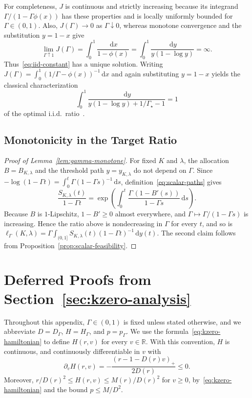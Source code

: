 \documentclass[11pt]{article}
\theoremstyle{definition}
\theoremstyle{remark}
\newcommand{\R}{\mathbb R}
\newcommand{\dd}{\,\mathrm d}
\newcommand{\pos}[1]{\left(#1\right)_+}
\begin{document}
For completeness, $J$ is continuous and strictly increasing because
its integrand $\Gamma/(1-\Gamma\phi(x))$ has these properties and is
locally uniformly bounded for $\Gamma\in(0,1)$.
Also, $J(\Gamma)\to0$ as $\Gamma\downarrow0$, whereas monotone
convergence and the substitution $y=1-x$ give
\[
 \lim_{\Gamma\uparrow1}J(\Gamma)
 =\int_0^1\frac{\dd x}{1-\phi(x)}
 =\int_0^1\frac{\dd y}{y(1-\log y)}
 =\infty.
\]
Thus~\eqref{eq:iid-constant} has a unique solution.
Writing $J(\Gamma)=\int_0^1(1/\Gamma-\phi(x))^{-1}\dd x$ and
again substituting $y=1-x$ yields the classical characterization
\[
 \int_0^1
 \frac{\dd y}{y(1-\log y)+1/\Gamma_\star-1}=1
\]
of the optimal i.i.d.\ ratio~\citep{Kertz86,CFHOV21}.

\subsection{Monotonicity in the Target Ratio}\label{app:gamma-monotone}

\begin{proof}[Proof of Lemma~\ref{lem:gamma-monotone}]
For fixed $K$ and $\lambda$, the allocation $B=B_{K,\lambda}$ and the threshold path $y=y_{K,\lambda}$ do not depend on $\Gamma$.
Since $-\log(1-\Gamma t)=\int_0^t\Gamma(1-\Gamma s)^{-1}\dd s$, definition~\eqref{eq:scalar-paths} gives
\[
 \frac{S_{K,\lambda}(t)}{1-\Gamma t}
 =\exp\!\left(\int_0^t\frac{\Gamma\,(1-B'(s))}{1-\Gamma s}\dd s\right).
\]
Because $B$ is $1$-Lipschitz, $1-B'\ge0$ almost everywhere, and $\Gamma\mapsto\Gamma/(1-\Gamma s)$ is increasing.
Hence the ratio above is nondecreasing in $\Gamma$ for every $t$, and so is $\ell_\Gamma(K,\lambda)=\Gamma\int_{(0,1]}S_{K,\lambda}(t)(1-\Gamma t)^{-1}\dd y(t)$.
The second claim follows from Proposition~\ref{prop:scalar-feasibility}.
\end{proof}

\section{Deferred Proofs from Section~\ref{sec:kzero-analysis}}\label{app:kzero-proofs}

Throughout this appendix, $\Gamma\in(0,1)$ is fixed unless stated otherwise, and we abbreviate $D=D_\Gamma$, $H=H_\Gamma$, and $p=p_\Gamma$.
We use the formula~\eqref{eq:kzero-hamiltonian} to define $H(r,v)$ for every $v\in\R$.
With this convention, $H$ is continuous, and continuously differentiable in $v$ with
\begin{equation}\label{eq:hamiltonian-derivative}
 \partial_vH(r,v)=-\frac{\pos{r-1-D(r)v}}{2D(r)}\le0.
\end{equation}
Moreover, $r/D(r)^2\le H(r,v)\le M(r)/D(r)^2$ for $v\ge0$, by~\eqref{eq:kzero-hamiltonian} and the bound $p\le M/D^2$.
\end{document}
